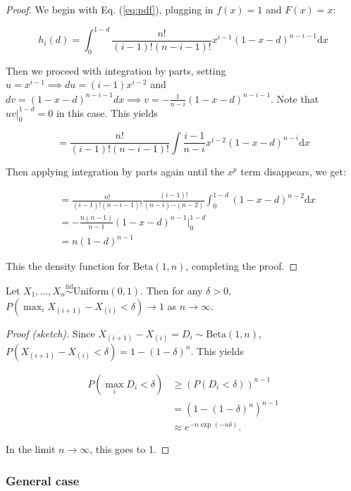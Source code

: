 \documentclass[
  11pt,
]{article}
\begin{document}
\begin{proof}
We begin with Eq. (\ref{eq:pdf}), plugging in $f(x) = 1$ and $F(x) = x$:

$$
h_i(d) = \int_0^{1-d} \frac{n!}{(i-1)! (n-i-1)!} x^{i-1} (1-x-d)^{n-i-1} \mathrm{d}x
$$

Then we proceed with integration by parts, setting 
$u = x^{i-1} \implies du = (i-1) x^{i-2}$ and 
$dv = (1-x-d)^{n-i-1} dx \implies v = -\frac{1}{n-i} (1-x-d)^{n-i-1}$. 
Note that $u v |_0^{1-d} = 0$ in this case. This yields

$$
= \frac{n!}{(i-1)! (n-i-1)!} \int \frac{i-1}{n-i} x^{i-2} (1-x-d)^{n-i} \mathrm{d}x
$$

Then applying integration by parts again until the $x^p$ term disappears, we get:

$$
\begin{aligned}
& = \frac{n!}{(i-1)! (n-i-1)!} \frac{(i-1)!}{(n-i) \cdots (n-2)} \int_0^{1-d} (1-x-d)^{n-2} \mathrm{d}x \\
& = -\frac{n (n-1)}{n-1} (1-x-d)^{n-1} \Big|_0^{1-d} \\
& = n (1 - d)^{n-1}
\end{aligned}
$$

This the density function for $\mathrm{Beta}(1, n)$, completing the proof.
\end{proof}

\begin{theorem}
Let $X_1, ..., X_n \stackrel{\mathrm{iid}}{\sim}\mathrm{Uniform}(0, 1)$. 
Then for any $\delta > 0$, $P(\max_i X_{(i+1)} - X_{(i)} < \delta) \to 1$ as 
$n \to \infty$.
\end{theorem}

\begin{proof}[Proof (sketch)]
Since $X_{(i+1)} - X_{(i)} = D_i \sim \mathrm{Beta}(1, n)$, 
$P(X_{(i+1)} - X_{(i)} < \delta) = 1 - (1 - \delta)^n $. This yields

$$
\begin{aligned}
P(\max_i D_i < \delta) & \geq (P(D_i < \delta))^{n-1} \\
& = (1 - (1 - \delta)^n)^{n-1} \\
& \approx e^{-n \exp(-n \delta)}.
\end{aligned}
$$

In the limit $n \to \infty$, this goes to 1.
\end{proof}

\hypertarget{general-case}{%
\subsubsection{General case}\label{general-case}}
\end{document}
